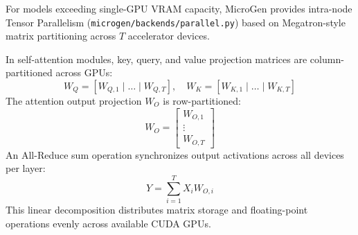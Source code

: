 For models exceeding single-GPU VRAM capacity, \textsf{MicroGen} provides intra-node Tensor Parallelism (\texttt{microgen/backends/parallel.py}) based on Megatron-style matrix partitioning across $T$ accelerator devices.

In self-attention modules, key, query, and value projection matrices are column-partitioned across GPUs:
\begin{equation}
    W_Q = [W_{Q,1} \mid \dots \mid W_{Q,T}], \quad W_K = [W_{K,1} \mid \dots \mid W_{K,T}]
\end{equation}
The attention output projection $W_O$ is row-partitioned:
\begin{equation}
    W_O = \begin{bmatrix} W_{O,1} \\ \vdots \\ W_{O,T} \end{bmatrix}
\end{equation}
An \textsf{All-Reduce} sum operation synchronizes output activations across all devices per layer:
\begin{equation}
    Y = \sum_{i=1}^T X_i W_{O,i}
\end{equation}
This linear decomposition distributes matrix storage and floating-point operations evenly across available CUDA GPUs.
